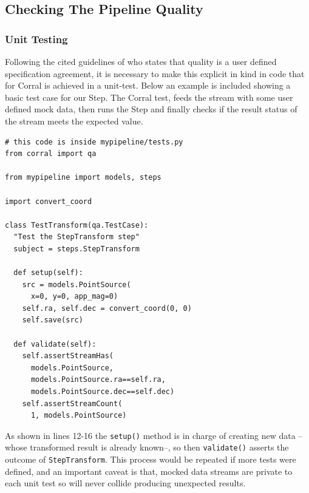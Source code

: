\documentclass[final,5p,times,twocolumn,authoryear]{elsarticle}
\begin{document}
\subsection{Checking The Pipeline Quality}
%
\subsubsection{Unit Testing}
Following the cited guidelines of \cite{feigenbaum1983total} who states
that quality is a user defined specification agreement, it is necessary to make
this explicit in kind in code that for Corral is achieved in a unit-test.
%
Below an example is included showing a basic test case for our Step. The Corral test,
feeds the stream with some user defined mock data, then
runs the Step and finally checks if the result status of the stream meets
the expected value.
%
\begin{verbatim}
# this code is inside mypipeline/tests.py
from corral import qa

from mypipeline import models, steps

import convert_coord

class TestTransform(qa.TestCase):
  "Test the StepTransform step"
  subject = steps.StepTransform

  def setup(self):
    src = models.PointSource(
      x=0, y=0, app_mag=0)
    self.ra, self.dec = convert_coord(0, 0)
    self.save(src)

  def validate(self):
    self.assertStreamHas(
      models.PointSource,
      models.PointSource.ra==self.ra,
      models.PointSource.dec==self.dec)
    self.assertStreamCount(
      1, models.PointSource)
\end{verbatim}
%
As shown in lines 12-16 the \texttt{setup()} method is in charge of
creating new data --whose transformed result is already known--,
so then \texttt{validate()} asserts the outcome of \texttt{StepTransform}.
%
This process would be repeated if more tests were defined, and
an important caveat is that, mocked data streams are private to each unit test
so will never collide producing unexpected results.
%
\end{document}
